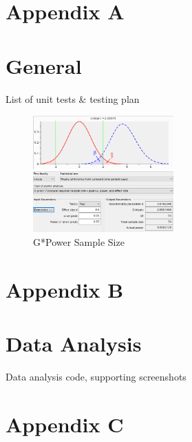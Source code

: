 \section*{Appendix A}
\section*{General}
\label{append:a}
List of unit tests \& testing plan
\begin{figure}[ht]
    \includegraphics[width=0.48\textwidth]{./Images/gpower.png}
    \centering
    \caption{G*Power Sample Size}
    \label{gpower}
\end{figure}

\section*{Appendix B}
\section*{Data Analysis}
\label{append:b}
Data analysis code, supporting screenshots


\newpage
\section*{Appendix C}
